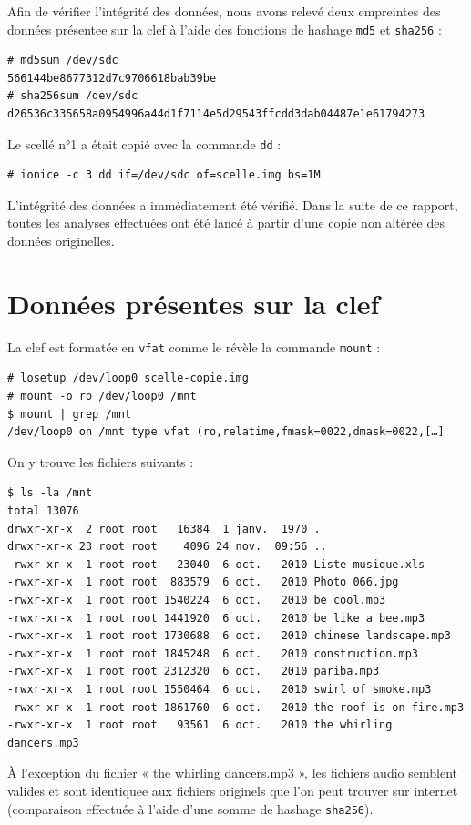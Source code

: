 \documentclass[a4paper,11pt]{article}
\begin{document}
Afin de vérifier l’intégrité des données, nous avons relevé deux empreintes des
données présentee sur la clef à l’aide des fonctions de hashage
{\tt md5} et {\tt sha256} :
\begin{verbatim}
# md5sum /dev/sdc
566144be8677312d7c9706618bab39be
# sha256sum /dev/sdc
d26536c335658a0954996a44d1f7114e5d29543ffcdd3dab04487e1e61794273
\end{verbatim}

Le scellé n°1 a était copié avec la commande {\tt dd} :
\begin{verbatim}
# ionice -c 3 dd if=/dev/sdc of=scelle.img bs=1M
\end{verbatim}

L’intégrité des données a immédiatement été vérifié.
Dans la suite de ce rapport, toutes les analyses effectuées ont été lancé à
partir d’une copie non altérée des données originelles.

\section{Données présentes sur la clef}

La clef est formatée en {\tt vfat} comme le révèle la commande {\tt mount} :
\begin{verbatim}
# losetup /dev/loop0 scelle-copie.img
# mount -o ro /dev/loop0 /mnt
$ mount | grep /mnt
/dev/loop0 on /mnt type vfat (ro,relatime,fmask=0022,dmask=0022,[…]
\end{verbatim}

On y trouve les fichiers suivants :
\begin{verbatim}
$ ls -la /mnt
total 13076
drwxr-xr-x  2 root root   16384  1 janv.  1970 .
drwxr-xr-x 23 root root    4096 24 nov.  09:56 ..
-rwxr-xr-x  1 root root   23040  6 oct.   2010 Liste musique.xls
-rwxr-xr-x  1 root root  883579  6 oct.   2010 Photo 066.jpg
-rwxr-xr-x  1 root root 1540224  6 oct.   2010 be cool.mp3
-rwxr-xr-x  1 root root 1441920  6 oct.   2010 be like a bee.mp3
-rwxr-xr-x  1 root root 1730688  6 oct.   2010 chinese landscape.mp3
-rwxr-xr-x  1 root root 1845248  6 oct.   2010 construction.mp3
-rwxr-xr-x  1 root root 2312320  6 oct.   2010 pariba.mp3
-rwxr-xr-x  1 root root 1550464  6 oct.   2010 swirl of smoke.mp3
-rwxr-xr-x  1 root root 1861760  6 oct.   2010 the roof is on fire.mp3
-rwxr-xr-x  1 root root   93561  6 oct.   2010 the whirling dancers.mp3
\end{verbatim}

À l’exception du fichier « the whirling dancers.mp3 », les fichiers audio
semblent valides et sont identiquee aux fichiers originels que l’on peut trouver
sur internet (comparaison effectuée à l’aide d’une somme de hashage {\tt sha256}).
\end{document}
